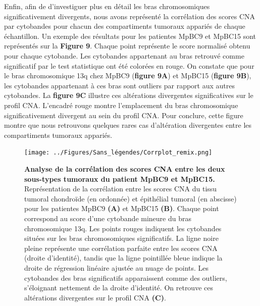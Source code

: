 \documentclass[11pt]{article}
\begin{document}
Enfin, afin de d’investiguer plus en détail les bras chromosomiques significativement divergents, nous avons représenté la corrélation des scores CNA par cytobandes pour chacun des compartiments tumoraux appariés de chaque échantillon. Un exemple des résultats pour les patientes MpBC9 et MpBC15 sont représentés sur la \textbf{Figure 9}. Chaque point représente le score normalisé obtenu pour chaque cytobande. Les cytobandes appartenant au bras retrouvé comme significatif par le test statistique ont été colorées en rouge. On constate que pour le bras chromosomique 13q chez MpBC9 (\textbf{figure 9A}) et MpBC15 (\textbf{figure 9B}), les cytobandes appartenant à ces bras sont outliers par rapport aux autres cytobandes. La \textbf{figure 9C} illustre ces altérations divergentes significatives sur le profil CNA. L’encadré rouge montre l’emplacement du bras chromosomique significativement divergent au sein du profil CNA. Pour conclure, cette figure montre que nous retrouvons quelques rares cas d’altération divergentes entre les compartiments tumoraux appariés.

\begin{figure}[H]
    \centering
    \texttt{[image: ../Figures/Sans\_légendes/Corrplot\_remix.png]}
    \caption[\textbf{Figure 9 : Analyse de la corrélation des scores CNA entre les deux sous-types tumoraux du patient MpBC9 et MpBC15.}]{\footnotesize \textbf{Analyse de la corrélation des scores CNA entre les deux sous-types tumoraux du patient MpBC9 et MpBC15.} Représentation de la corrélation entre les scores CNA du tissu tumoral chondroïde (en ordonnée) et épithélial tumoral (en abscisse) pour les patientes MpBC9 \textbf{(A)} et MpBC15 \textbf{(B)}. Chaque point correspond au score d’une cytobande mineure du bras chromosomique 13q. Les points rouges indiquent les cytobandes situées sur les bras chromosomiques significatifs. La ligne noire pleine représente une corrélation parfaite entre les scores CNA (droite d’identité), tandis que la ligne pointillée bleue indique la droite de régression linéaire ajustée au nuage de points. Les cytobandes des bras significatifs apparaissent comme des outliers, s’éloignant nettement de la droite d’identité. On retrouve ces altérations divergentes sur le profil CNA \textbf{(C)}.}
    \label{fig:fig9}
\end{figure}





\newpage
\end{document}
